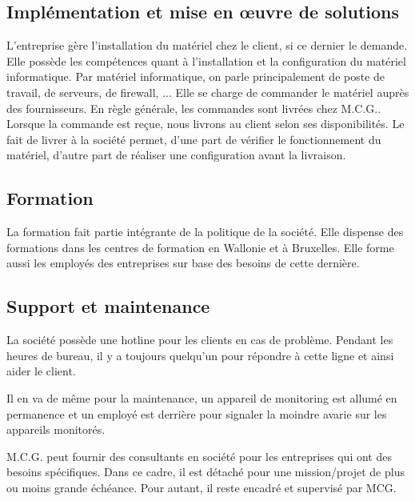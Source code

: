 \subsection*{Implémentation et mise en œuvre de solutions}
L'entreprise gère l'installation du matériel chez le client, si ce dernier le demande.
Elle possède les compétences quant à l'installation et la configuration du matériel informatique.
Par matériel informatique, on parle principalement de poste de travail, de serveurs, de firewall, ...
Elle se charge de commander le matériel auprès des fournisseurs.
En règle générale, les commandes sont livrées chez M.C.G..
Lorsque la commande est reçue, nous livrons au client selon ses disponibilités.
Le fait de livrer à la société permet, d'une part de vérifier le fonctionnement du matériel, d'autre part de réaliser une configuration avant la livraison.

\subsection*{Formation}
La formation fait partie intégrante de la politique de la société.
Elle dispense des formations dans les centres de formation en Wallonie et à Bruxelles. 
Elle forme aussi les employés des entreprises sur base des besoins de cette dernière.

\subsection*{Support et maintenance}
La société possède une hotline pour les clients en cas de problème. 
Pendant les heures de bureau, il y a toujours quelqu'un pour répondre à cette ligne et ainsi aider le client.

Il en va de même pour la maintenance, un appareil de monitoring est allumé en permanence et un employé est derrière pour signaler la moindre avarie sur les appareils monitorés.

M.C.G. peut fournir des consultants en société pour les entreprises qui ont des besoins spécifiques. 
Dans ce cadre, il est détaché pour une mission/projet de plus ou moins grande échéance.
Pour autant, il reste encadré et supervisé par MCG.
